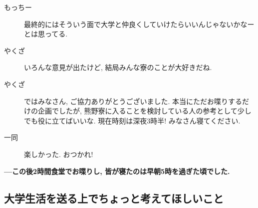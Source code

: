 \documentclass[10pt,b5jsbook,dvips,dvipdfmx,openany]{jsbook}
\theoremstyle{definition}
\begin{document}
\begin{multicols}{2}
\begin{description}
		\item[もっちー]最終的にはそういう面で大学と仲良くしていけたらいいんじゃないかなーとは思ってる.
		\item[やくざ]いろんな意見が出たけど, 結局みんな寮のことが大好きだね.
		\item[やくざ]ではみなさん, ご協力ありがとうございました. 本当にただお喋りするだけの企画でしたが, 熊野寮に入ることを検討している人の参考として少しでも役に立てばいいな. 現在時刻は深夜3時半! みなさん寝てください.
		\item[ 一同 ]楽しかった. おつかれ!
		\end{description}
		\textbf{---この後2時間食堂でお喋りし, 皆が寝たのは早朝5時を過ぎた頃でした. }

\end{multicols}
\normalsize
		\subsection{大学生活を送る上でちょっと考えてほしいこと}
\end{document}
